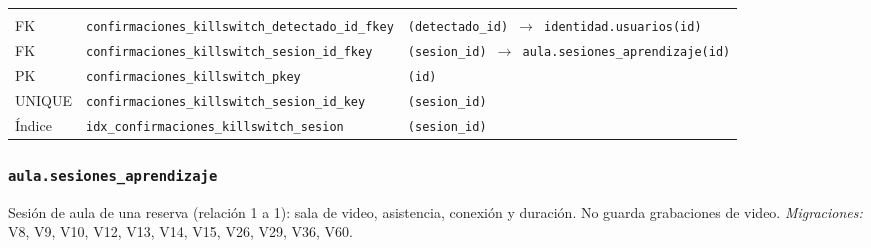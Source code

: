 {\small
\begin{xltabular}{\textwidth}{@{}>{\raggedright\arraybackslash}p{1.7cm} >{\raggedright\arraybackslash}p{4.6cm} L@{}}
    \toprule
     &  &  \\
    \midrule
    \endfirsthead
    \toprule
     &  &  \\
    \midrule
    \endhead
    \bottomrule
    \endfoot
    FK & \texttt{confirmaciones\_\allowbreak{}killswitch\_\allowbreak{}detectado\_\allowbreak{}id\_\allowbreak{}fkey} & \texttt{(\allowbreak{}detectado\_\allowbreak{}id) $\rightarrow$ identidad.usuarios(\allowbreak{}id)} \\
    FK & \texttt{confirmaciones\_\allowbreak{}killswitch\_\allowbreak{}sesion\_\allowbreak{}id\_\allowbreak{}fkey} & \texttt{(\allowbreak{}sesion\_\allowbreak{}id) $\rightarrow$ aula.sesiones\_\allowbreak{}aprendizaje(\allowbreak{}id)} \\
    PK & \texttt{confirmaciones\_\allowbreak{}killswitch\_\allowbreak{}pkey} & \texttt{(\allowbreak{}id)} \\
    UNIQUE & \texttt{confirmaciones\_\allowbreak{}killswitch\_\allowbreak{}sesion\_\allowbreak{}id\_\allowbreak{}key} & \texttt{(\allowbreak{}sesion\_\allowbreak{}id)} \\
    Índice & \texttt{idx\_\allowbreak{}confirmaciones\_\allowbreak{}killswitch\_\allowbreak{}sesion} & \texttt{(\allowbreak{}sesion\_\allowbreak{}id)} \\
\end{xltabular}
}

\subsubsection{\texorpdfstring{\texttt{aula.sesiones\_\allowbreak{}aprendizaje}}{aula.sesiones\_aprendizaje}}\label{dd:aula.sesiones_aprendizaje}

Sesión de aula de una reserva (relación 1 a 1): sala de video, asistencia, conexión y duración. No guarda grabaciones de video. \emph{Migraciones:} V8, V9, V10, V12, V13, V14, V15, V26, V29, V36, V60.

